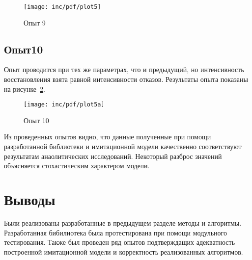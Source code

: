 \begin{figure}[ht!]
  \centering
  \texttt{[image: inc/pdf/plot5]}
  \caption{Опыт 9}
  \label{fig:plot5}
\end{figure}

\subsection*{Опыт10}

Опыт проводится при тех же параметрах, что и предыдущий, но интенсивность восстановления взята равной интенсивности отказов. Результаты опыта показаны на рисунке~\ref{fig:plot5a}.

\begin{figure}[ht!]
  \centering
  \texttt{[image: inc/pdf/plot5a]}
  \caption{Опыт 10}
  \label{fig:plot5a}
\end{figure}

Из проведенных опытов видно, что данные полученные при помощи разработанной библиотеки и имитационной модели качественно соответствуют результатам анаолитических исследований. Некоторый разброс значений объясняется стохастическим характером модели.

\section{Выводы}

Были реализованы разработанные в предыдущем разделе методы и алгоритмы. Разработанная бибилиотека была протестирована при помощи модульного тестирования. Также был проведен ряд опытов подтверждащих адекватность построенной имитационной модели и корректность реализованных алгоритмов.

